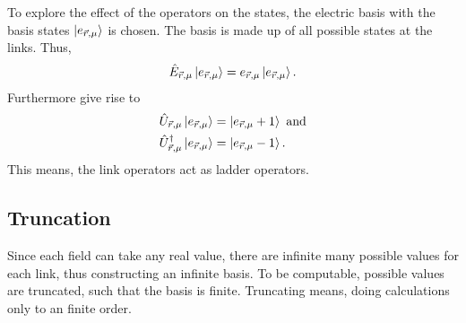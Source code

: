 To explore the effect of the operators on the states, the electric basis with the basis states $\ket{e_{\vec{r}, \mu}}$ is chosen. The basis is made up of all possible states at the links. Thus,
\begin{align}
  \hat{E}_{\vec{r}, \mu}\ket{e_{\vec{r}, \mu}}=e_{\vec{r}, \mu}\ket{e_{\vec{r}, \mu}}.\label{eq:eig}
\end{align}
Furthermore  give rise to 
\begin{align}
  \hat{U}_{\vec{r}, \mu}\ket{e_{\vec{r}, \mu}}      & =\ket{e_{\vec{r}, \mu}+1}\text{ and}\label{eq:eigu1} \\
  \hat{U}_{\vec{r}, \mu}^\dag\ket{e_{\vec{r}, \mu}} & =\ket{e_{\vec{r}, \mu}-1}.\label{eq:eigu2}
\end{align}
This means, the link operators act as ladder operators.
\subsection{Truncation}
Since each field can take any real value, there are infinite many possible values for each link, thus constructing an infinite basis. To be computable, possible values are truncated, such that the basis is finite. Truncating means, doing calculations only to an finite order.


